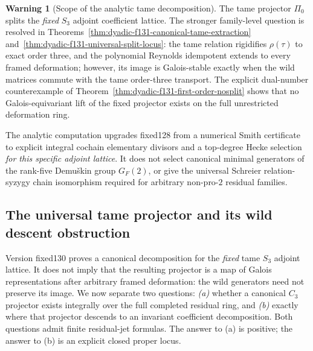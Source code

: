 \documentclass[11pt]{article}
\theoremstyle{definition}
\newtheorem{warning}[theorem]{Warning}
\begin{document}
\begin{warning}[Scope of the analytic tame decomposition]
\label{warn:dyadic-s3-adjoint-tame-splitting-scope}
The tame projector $\Pi_0$
splits the \emph{fixed}
$S_3$ adjoint coefficient
lattice.  The stronger
family-level question is
resolved in
Theorems~\ref{thm:dyadic-f131-canonical-tame-extraction}
and~\ref{thm:dyadic-f131-universal-split-locus}:
the tame relation rigidifies
$\rho(\tau)$ to exact order
three, and the polynomial
Reynolds idempotent extends
to every framed deformation;
however, its image is
Galois-stable exactly when
the wild matrices commute
with the tame order-three
transport.  The explicit
dual-number counterexample
of Theorem~\ref{thm:dyadic-f131-first-order-nosplit}
shows that no Galois-equivariant
lift of the fixed projector
exists on the full
unrestricted deformation
ring.

The analytic computation
upgrades fixed128 from
a numerical Smith
certificate to explicit
integral cochain
elementary divisors
and a top-degree Hecke
selection \emph{for this
specific adjoint lattice}.
It does not select
canonical minimal generators
of the rank-five
Demu\v{s}kin group
$G_F(2)$, or give
the universal Schreier
relation-syzygy chain
isomorphism required
for arbitrary non-pro-$2$
residual families.
\end{warning}


\subsection{The universal tame projector and its wild descent obstruction}
\label{subsec:dyadic-s3-universal-tame-projector}

Version fixed130 proves a canonical decomposition for the
\emph{fixed} tame $S_3$ adjoint lattice.  It does not imply
that the resulting projector is a map of Galois
representations after arbitrary framed deformation:
the wild generators need not preserve its image.
We now separate two questions:
\emph{(a)} whether a canonical $C_3$ projector exists
integrally over the full completed residual ring, and
\emph{(b)} exactly where that projector descends to
an invariant coefficient decomposition.
Both questions admit finite residual-jet formulas.
The answer to (a) is positive; the answer to (b)
is an explicit closed proper locus.
\end{document}
